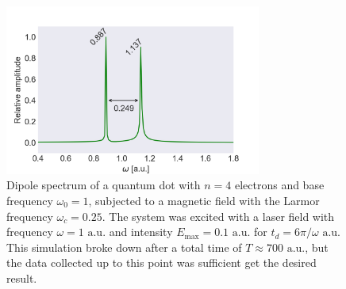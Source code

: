 \begin{figure}
    \centering    
    \includegraphics[width=0.75\textwidth]
        {results/figures/B_field/n=4/b_spectrum_n=4_omc=025.png}
    \caption{Dipole spectrum of a quantum dot with $n=4$ electrons and base frequency 
        $\omega_0 = 1$,
        subjected to a magnetic field with the Larmor frequency $\omega_c=0.25$. The 
        system was excited with a laser field with frequency $\omega = 1 \text{ a.u.}$ 
        and intensity $E_\text{max} = 0.1 \text{ a.u.}$ for $t_d = 6\pi/\omega \text{ a.u.}$
        This simulation broke down after a total time of $T\approx700 \text{ a.u.}$,
        but the data collected up to this point was sufficient get the desired result.
        }
    \label{fig:b_n4_omc025}
\end{figure}

\clearemptydoublepage
